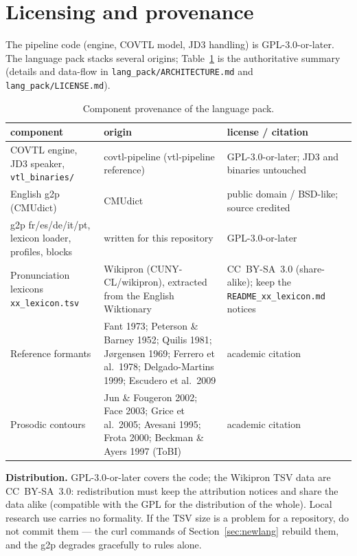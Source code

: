 \documentclass[11pt,a4paper]{article}
\newcommand{\code}[1]{\texttt{#1}}
\begin{document}
\section{Licensing and provenance}
\label{sec:license}

The pipeline code (engine, COVTL model, JD3 handling) is
GPL-3.0-or-later. The language pack stacks several origins;
Table~\ref{tab:provenance} is the authoritative summary (details and
data-flow in \code{lang\_pack/ARCHITECTURE.md} and
\code{lang\_pack/LICENSE.md}).

\begin{table}[htbp]
\centering
\caption{Component provenance of the language pack.}
\label{tab:provenance}
\small
\begin{tabular}{p{}p{}p{}}
\toprule
component & origin & license / citation \\
\midrule
COVTL engine, JD3 speaker, \code{vtl\_binaries/} & covtl-pipeline
(vtl-pipeline reference) & GPL-3.0-or-later; JD3 and binaries
untouched \\
English g2p (CMUdict) & CMUdict & public domain / BSD-like; source
credited \\
g2p fr/es/de/it/pt, lexicon loader, profiles, blocks & written for
this repository & GPL-3.0-or-later \\
Pronunciation lexicons \code{xx\_lexicon.tsv} & Wikipron
(CUNY-CL/wikipron), extracted from the English Wiktionary &
CC~BY-SA~3.0 (share-alike); keep the \code{README\_xx\_lexicon.md}
notices \\
Reference formants & Fant 1973; Peterson \& Barney 1952; Quilis
1981; J{\o}rgensen 1969; Ferrero et al.\ 1978; Delgado-Martins 1999;
Escudero et al.\ 2009 & academic citation \\
Prosodic contours & Jun \& Fougeron 2002; Face 2003; Grice et al.\
2005; Avesani 1995; Frota 2000; Beckman \& Ayers 1997 (ToBI) &
academic citation \\
\bottomrule
\end{tabular}
\end{table}

\textbf{Distribution.} GPL-3.0-or-later covers the code; the Wikipron
TSV data are CC~BY-SA~3.0: redistribution must keep the attribution
notices and share the data alike (compatible with the GPL for the
distribution of the whole). Local research use carries no formality.
If the TSV size is a problem for a repository, do not commit them ---
the curl commands of Section~\ref{sec:newlang} rebuild them, and the
g2p degrades gracefully to rules alone.
\end{document}
